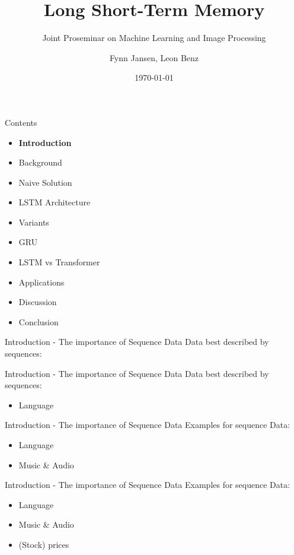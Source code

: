 \documentclass[10pt, aspectratio=169]{beamer}
\title{Long Short-Term Memory}
\subtitle{Joint Proseminar on Machine Learning and Image Processing}
\date{\today}
\author{Fynn Jansen, Leon Benz}
\institute{Chair of Computer Science 13 (Computer Vision)\\RWTH Aachen}
\begin{document}
\maketitle


\begin{frame}[t]{Contents}
\begin{itemize}
    \item \textbf{Introduction}
    \item Background
    \item Naive Solution
    \item LSTM Architecture
    \item Variants
    \item GRU
    \item LSTM vs Transformer
    \item Applications
    \item Discussion
    \item Conclusion
\end{itemize}
\end{frame}

\begin{frame}[t]{Introduction - The importance of Sequence Data}
Data best described by sequences:
\end{frame}

\begin{frame}[t]{Introduction - The importance of Sequence Data}
Data best described by sequences:
\begin{itemize}
    \item Language
\end{itemize}
\end{frame}

\begin{frame}[t]{Introduction - The importance of Sequence Data}
Examples for sequence Data:
\begin{itemize}
    \item Language
    \item Music \& Audio
\end{itemize}
\end{frame}

\begin{frame}[t]{Introduction - The importance of Sequence Data}
Examples for sequence Data:
\begin{itemize}
    \item Language
    \item Music \& Audio
    \item (Stock) prices
\end{itemize}
\end{frame}
\end{document}
